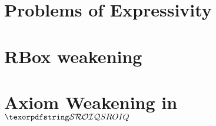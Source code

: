 

\section{Problems of Expressivity} \label{expressivity-problems}



\section{RBox weakening} \label{rbox-weakening}



\section{Axiom Weakening in \texorpdfstring{$\SROIQ$}{SROIQ}} \label{weakening-sroiq}


